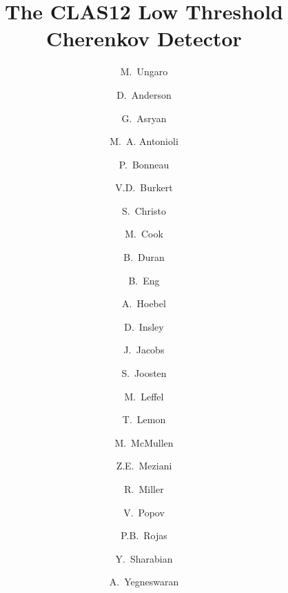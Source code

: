 \title{The CLAS12 Low Threshold Cherenkov Detector}


\author[JLAB]{M.~Ungaro}
\author[A]{D.~Anderson}      %
\author[A]{G.~Asryan}        %
\author[A]{M.~A. Antonioli}  %
\author[A]{P.~Bonneau}       %
\author[A]{V.D.~Burkert}     %
\author[A]{S.~Christo}       %
\author[A]{M.~Cook}          %
\author[TEMPLE]{B.~Duran}    %
\author[A]{B.~Eng}           %
\author[A]{A.~Hoebel}        %
\author[A]{D.~Insley}        %
\author[A]{J.~Jacobs}        %
\author[ARGONNE]{S.~Joosten} %
\author[A]{M.~Leffel}        %
\author[A]{T.~Lemon}         %
\author[A]{M.~McMullen}      %
\author[B,C]{Z.E.~Meziani}   %
\author[A]{R.~Miller}        %
\author[A]{V.~Popov}         %
\author[A]{P.B.~Rojas}       %
\author[JLAB]{Y.~Sharabian}  %
\author[A]{A.~Yegneswaran}   %


\address[JLAB]{Thomas Jefferson National Accelerator Facility, Newport News, VA 23606, USA}
\address[TEMPLE]{Temple University, Philadelphia, PA 19122, USA}
\address[ARGONNE]{Argonne National Laboratory, Lemont, IL 60439, USA}
